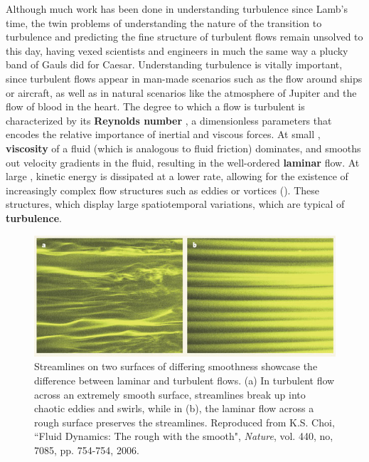 Although much work has been done in understanding turbulence since Lamb's time, the twin problems of understanding the nature of the transition to turbulence and predicting the fine structure of turbulent flows remain unsolved to this day, having vexed scientists and engineers in much the same way a plucky band of Gauls did for Caesar. Understanding turbulence is vitally important, since turbulent flows appear in man-made scenarios such as the flow around ships or aircraft, as well as in natural scenarios like the atmosphere of Jupiter and the flow of blood in the heart. The degree to which a flow is turbulent is characterized by its {\bf Reynolds number} \ReN, a dimensionless parameters that encodes the relative importance of inertial and viscous forces. At small \ReN, {\bf viscosity} of a fluid (which is analogous to fluid friction) dominates, and smooths out velocity gradients in the fluid, resulting in the well-ordered {\bf laminar} flow. At large \ReN, kinetic energy is dissipated at a lower rate, allowing for the existence of increasingly complex flow structures such as eddies or vortices (). These structures, which display large spatiotemporal variations, which are typical of {\bf turbulence}.
\begin{figure}[h]
\centerline{
\includegraphics[width=\textwidth]{Figs/laminarTurbulent}}
\caption{Streamlines on two surfaces of differing smoothness showcase the difference between laminar and turbulent flows. (a) In turbulent flow across an extremely smooth surface, streamlines break up into chaotic eddies and swirls, while in (b), the laminar flow across a rough surface preserves the streamlines. Reproduced from K.S. Choi, ``Fluid Dynamics: The rough with the smooth", \emph{Nature},  vol. 440, no, 7085, pp. 754-754, 2006.}\label{fig:cylinderWake}
\end{figure}
